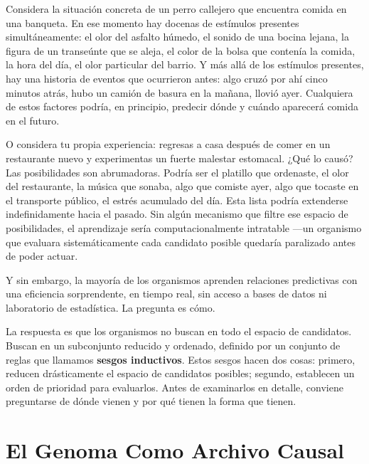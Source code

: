 \documentclass[
  letterpaper,
  DIV=11,
  numbers=noendperiod]{scrreprt}
\begin{document}
\begin{tcolorbox}[enhanced jigsaw, toprule=.15mm, arc=.35mm, colback=white, opacityback=0, colframe=quarto-callout-note-color-frame, breakable, rightrule=.15mm, left=2mm, leftrule=.75mm, bottomrule=.15mm]
Considera la situación concreta de un perro callejero que encuentra
comida en una banqueta. En ese momento hay docenas de estímulos
presentes simultáneamente: el olor del asfalto húmedo, el sonido de una
bocina lejana, la figura de un transeúnte que se aleja, el color de la
bolsa que contenía la comida, la hora del día, el olor particular del
barrio. Y más allá de los estímulos presentes, hay una historia de
eventos que ocurrieron antes: algo cruzó por ahí cinco minutos atrás,
hubo un camión de basura en la mañana, llovió ayer. Cualquiera de estos
factores podría, en principio, predecir dónde y cuándo aparecerá comida
en el futuro.

O considera tu propia experiencia: regresas a casa después de comer en
un restaurante nuevo y experimentas un fuerte malestar estomacal. ¿Qué
lo causó? Las posibilidades son abrumadoras. Podría ser el platillo que
ordenaste, el olor del restaurante, la música que sonaba, algo que
comiste ayer, algo que tocaste en el transporte público, el estrés
acumulado del día. Esta lista podría extenderse indefinidamente hacia el
pasado. Sin algún mecanismo que filtre ese espacio de posibilidades, el
aprendizaje sería computacionalmente intratable ---un organismo que
evaluara sistemáticamente cada candidato posible quedaría paralizado
antes de poder actuar.

Y sin embargo, la mayoría de los organismos aprenden relaciones
predictivas con una eficiencia sorprendente, en tiempo real, sin acceso
a bases de datos ni laboratorio de estadística. La pregunta es cómo.

La respuesta es que los organismos no buscan en todo el espacio de
candidatos. Buscan en un subconjunto reducido y ordenado, definido por
un conjunto de reglas que llamamos \textbf{sesgos inductivos}. Estos
sesgos hacen dos cosas: primero, reducen drásticamente el espacio de
candidatos posibles; segundo, establecen un orden de prioridad para
evaluarlos. Antes de examinarlos en detalle, conviene preguntarse de
dónde vienen y por qué tienen la forma que tienen.

\section{El Genoma Como Archivo
Causal}\label{el-genoma-como-archivo-causal}


\end{tcolorbox}
\end{document}
